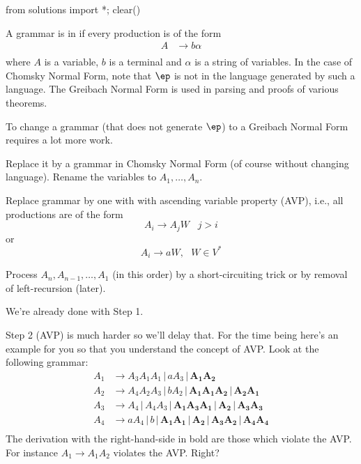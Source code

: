 \begin{python0}
from solutions import *; clear()
\end{python0}

A grammar is in  if every production
is of the form
\begin{align*}
 A &\rightarrow b\alpha\\
\end{align*}
where $A$ is a variable, $b$ is a terminal and $\alpha$ is a
string of variables. In the case of Chomsky Normal Form, note that
$\ep$ is not in the language generated by such a language. The
Greibach Normal Form is used in parsing and proofs of various
theorems.

To change a grammar (that does not generate $\ep$) to a Greibach
Normal Form requires a lot more work.
\begin{mylist}
 \item Replace it by a grammar in Chomsky Normal Form (of course
 without changing language). Rename the variables to $A_1, \ldots,
 A_n$.
 \item Replace grammar by one with with ascending variable property
 (AVP), i.e., all productions are of the form
  \[ A_i \rightarrow A_jW \,\,\,\,\, j>i \]
  or
  \[ A_i \rightarrow aW , \,\,\,\, W \in V^*\]
 \item Process $A_n, A_{n - 1}, \ldots, A_1$ (in this order) by a short-circuiting trick
 or by removal of left-recursion (later).
\end{mylist}
We're already done with Step 1.

Step 2 (AVP) is much harder so we'll delay that. For the time
being here's an example for you so that you understand the concept
of AVP. Look at the following grammar:
\begin{align*}
 A_1 &\rightarrow A_3A_1A_1 \,|\, aA_3 \,|\, \mathbf{A_1A_2} \\
 A_2 &\rightarrow A_4A_2A_3 \,|\, bA_2 \,|\, \mathbf{A_1A_1A_2} \,|\,
 \mathbf{A_2A_1} \\
 A_3 &\rightarrow A_4 \,|\, A_4 A_3 \,|\, \mathbf{A_1A_3A_1} \,|\,
 \mathbf{A_2}
 \,|\, \mathbf{A_3A_3} \\
 A_4 &\rightarrow aA_4 \,|\, b \,|\, \mathbf{A_1A_1} \,|\, \mathbf{A_2} \,|\,
 \mathbf{A_3A_2}
 \,|\, \mathbf{A_4A_4} \\
\end{align*}
The derivation with the right-hand-side in bold are those which
violate the AVP. For instance $A_1 \rightarrow A_1A_2$ violates
the AVP. Right?

